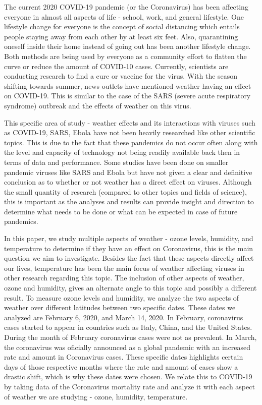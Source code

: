 \documentclass[10pt,journal,compsoc]{IEEEtran}
\begin{document}

The current 2020 COVID-19 pandemic  (or the Coronavirus) has been affecting everyone in almost all aspects of life - school, work, and general lifestyle. One lifestyle change for everyone is the concept of social distancing which entails people staying away from each other by at least six feet. Also, quarantining oneself inside their home instead of going out has been another lifestyle change. Both methods are being used by everyone as a community effort to flatten the curve or reduce the amount of COVID-10 cases. Currently, scientists are conducting research to find a cure or vaccine for the virus. With the season shifting towards summer, news outlets have mentioned weather having an effect on COVID-19. This is similar to the case of the SARS (severe acute respiratory syndrome) outbreak and the effects of weather on this virus. \cite{Tan-2005}

	This specific area of study - weather effects and its interactions with viruses such as COVID-19, SARS, Ebola have not been heavily researched like other scientific topics. This is due to the fact that these pandemics do not occur often along with the level and capacity of technology not being readily available back then in terms of data and performance. Some studies have been done on smaller pandemic viruses like SARS and Ebola but have not given a clear and definitive conclusion as to whether or not weather has a direct effect on viruses. Although the small quantity of research (compared to other topics and fields of science), this is important as the analyses and results can provide insight and direction to determine what needs to be done or what can be expected in case of future pandemics.

	In this paper, we study multiple aspects of weather - ozone levels, humidity, and temperature to determine if they have an effect on Coronavirus, this is the main question we aim to investigate. Besides the fact that these aspects directly affect our lives, temperature has been the main focus of weather affecting viruses in other research regarding this topic. The inclusion of other aspects of weather, ozone and humidity, gives an alternate angle to this topic and possibly a different result. To measure ozone levels and humidity, we analyze the two aspects of weather over different latitudes between two specific dates. These dates we analyzed are February 6, 2020, and March 14, 2020. In February, coronavirus cases started to appear in countries such as Italy, China, and the United States. During the month of February coronavirus cases were not as prevalent. In March, the coronavirus was oficially announced as a global pandemic with an increased rate and amount in Coronavirus cases. These specific dates highlights certain days of those respective months where the rate and amount of cases show a drastic shift, which is why these dates were chosen. We relate this to COVID-19 by taking data of the Coronavirus mortality rate and analyze it with each aspect of weather we are studying - ozone, humidity, temperature.
\end{document}
